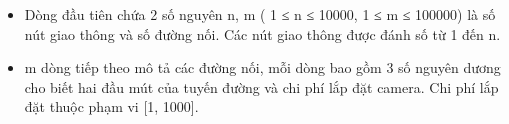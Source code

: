 \begin{itemize}
	\item     Dòng đầu tiên chứa 2 số nguyên n, m ( 1 ≤ n ≤ 10000, 1 ≤ m ≤ 100000)  là số nút giao thông và số đường nối. Các nút giao thông được đánh số từ 1 đến n.   
	\item     m dòng tiếp theo mô tả các đường nối, mỗi dòng bao gồm 3 số nguyên dương cho biết hai đầu mút của tuyến đường và chi phí lắp đặt camera. Chi phí lắp đặt thuộc phạm vi [1, 1000].   
\end{itemize}

\